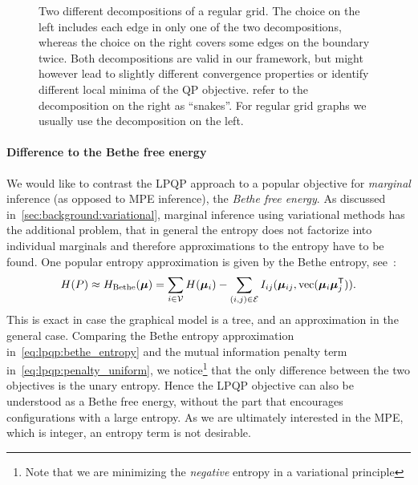 \begin{figure}[htb]
\begin{subfigure}[T]{0.48\textwidth}
    \end{subfigure}
    \caption[Decompositions of a regular grid]{
    Two different decompositions of a regular grid.
    The choice on the left includes each edge in only one of the two
    decompositions, whereas the choice on the right covers some edges on the
    boundary twice. Both decompositions are valid in our framework, but might
    however lead to slightly different convergence properties or identify
    different local minima of the \ac{QP} objective. \textcite{Jancsary2011}
    refer to the decomposition on the right as ``snakes''. For regular grid
    graphs we usually use the decomposition on the left.}
    \label{fig:lpqp:decompositions}
\end{figure}

\paragraph{Difference to the Bethe free energy} We would like to 
contrast the \ac{LPQP} approach to a popular objective for
\emph{marginal} inference (as opposed to \ac{MPE} inference), the \emph{Bethe
free energy}. As discussed in~\autoref{sec:background:variational}, marginal
inference using variational methods has the
additional problem, that in general the entropy does not factorize into
individual marginals and therefore approximations to the entropy have to be
found. One popular entropy approximation is given by the Bethe entropy,
see~\parencite[Chapter 4.1]{Wainwright2008}:
\begin{equation}
    H(P) \approx H_{\textrm{Bethe}}(\bm{\mu}) =
    \sum_{i\in\mathcal{V}} H(\bm{\mu}_i) - \sum_{(i,j)\in\mathcal{E}}
    I_{ij}(\bm{\mu}_{ij}, \mathrm{vec}(\bm{\mu}_i
    \bm{\mu}_j^{\mathsf{T}})).
    \label{eq:lpqp:bethe_entropy}
\end{equation}
This is exact in case the graphical model is a tree, and an approximation in the
general case. Comparing the Bethe entropy approximation
in~\eqref{eq:lpqp:bethe_entropy} and the mutual information penalty term
in~\eqref{eq:lpqp:penalty_uniform}, we notice\footnote{Note that we are
minimizing the \emph{negative} entropy in a variational principle} that the
only difference between the two objectives is the unary entropy. Hence the
\ac{LPQP} objective can also be understood as a Bethe free energy, without the
part that encourages configurations with a large entropy. As we are ultimately
interested in the \ac{MPE}, which is integer, an entropy term is not
desirable.


